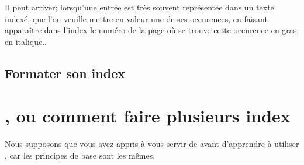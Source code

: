 Il peut arriver; lorsqu'une entrée est très souvent représentée dans un texte indexé, que l'on veuille mettre en valeur une de ses occurences, en faisant apparaître dans l'index le numéro de la page où se trouve cette occurence en gras, en italique..

\subsection{Formater son index}







\section{, ou comment faire plusieurs index}

\begin{prealable}
Nous supposons que vous avez appris à vous servir de  avant d'apprendre à utiliser , car les principes de base sont les mêmes.
\end{prealable}

